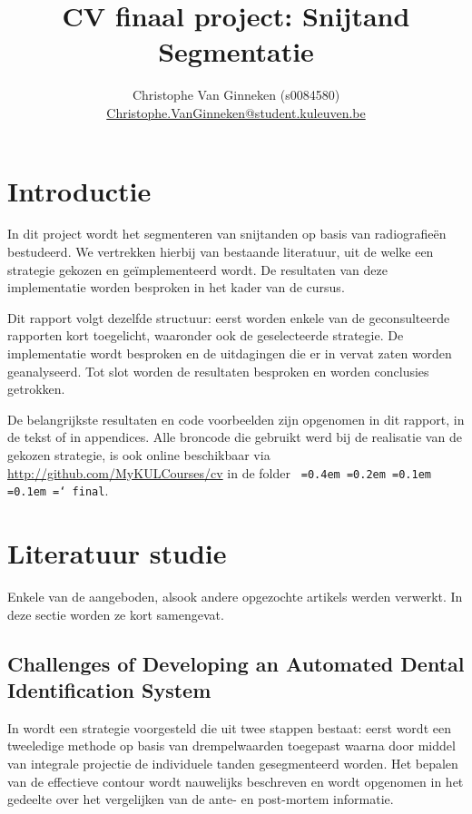 \documentclass[10pt,a4paper]{article}
\author{Christophe Van Ginneken (s0084580) \\
	\url{Christophe.VanGinneken@student.kuleuven.be} }
\title{CV finaal project: Snijtand Segmentatie}
\newcommand*\justify{%
  \fontdimen2\font=0.4em%
  \fontdimen3\font=0.2em%
  \fontdimen4\font=0.1em%
  \fontdimen7\font=0.1em%
  \hyphenchar\font=`\-%
}
\newcommand{\ttt}[1]{{\tt \justify{#1}}}
\begin{document}
\maketitle

\vspace{-1cm}
\section*{Introductie}

In dit project wordt het segmenteren van snijtanden op basis van radiografie\"en bestudeerd. We vertrekken hierbij van bestaande literatuur, uit de welke een strategie gekozen en ge\"implementeerd wordt. De resultaten van deze implementatie worden besproken in het kader van de cursus.

Dit rapport volgt dezelfde structuur: eerst worden enkele van de geconsulteerde rapporten kort toegelicht, waaronder ook de geselecteerde strategie. De implementatie wordt besproken en de uitdagingen die er in vervat zaten worden geanalyseerd. Tot slot worden de resultaten besproken en worden conclusies getrokken.

De belangrijkste resultaten en code voorbeelden zijn opgenomen in dit rapport, in de tekst of in appendices. Alle broncode die gebruikt werd bij de realisatie van de gekozen strategie, is ook online beschikbaar via \url{http://github.com/MyKULCourses/cv} in de folder \ttt{final}.

\section*{Literatuur studie}

Enkele van de aangeboden, alsook andere opgezochte artikels werden verwerkt. In deze sectie worden ze kort samengevat.

\subsection*{Challenges of Developing an Automated Dental Identification System}

In \cite{abdel2003challenges} wordt een strategie voorgesteld die uit twee stappen bestaat: eerst wordt een tweeledige methode op basis van drempelwaarden toegepast waarna door middel van integrale projectie de individuele tanden gesegmenteerd worden. Het bepalen van de effectieve contour wordt nauwelijks beschreven en wordt opgenomen in het gedeelte over het vergelijken van de ante- en post-mortem informatie.
\end{document}
